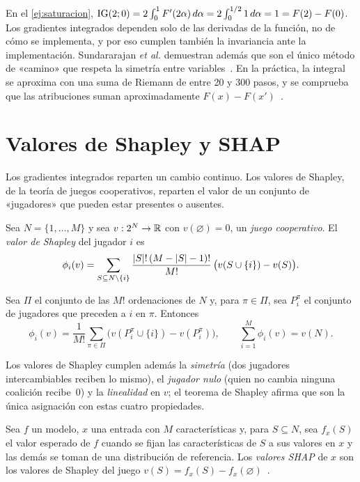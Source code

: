 En el \cref{ej:saturacion}, $\operatorname{IG}(2;0)=2\int_0^1F'(2\alpha)\,d\alpha=2\int_0^{1/2}1\,d\alpha=1=F(2)-F(0)$. Los gradientes integrados dependen solo de las derivadas de la función, no de cómo se implementa, y por eso cumplen también la invariancia ante la implementación. Sundararajan \emph{et al.} demuestran además que son el único método de «camino» que respeta la simetría entre variables~\cite[§4.2, teorema~1]{sundararajan}. En la práctica, la integral se aproxima con una suma de Riemann de entre 20 y 300 pasos, y se comprueba que las atribuciones suman aproximadamente $F(x)-F(x')$~\cite[§5]{sundararajan}.

\section{Valores de Shapley y SHAP}

Los gradientes integrados reparten un cambio continuo. Los valores de Shapley, de la teoría de juegos cooperativos, reparten el valor de un conjunto de «jugadores» que pueden estar presentes o ausentes.

\begin{definicion}\label{def:shapley}
Sea $N=\{1,\dots,M\}$ y sea $v:2^{N}\to\mathbb{R}$ con $v(\varnothing)=0$, un \emph{juego cooperativo}. El \emph{valor de Shapley} del jugador $i$ es
\[
\phi_i(v)=\sum_{S\subseteq N\setminus\{i\}}\frac{\lvert S\rvert!\,(M-\lvert S\rvert-1)!}{M!}\,\bigl(v(S\cup\{i\})-v(S)\bigr).
\]
\end{definicion}

\begin{proposicion}\label{prop:shapley}
Sea $\Pi$ el conjunto de las $M!$ ordenaciones de $N$ y, para $\pi\in\Pi$, sea $P_i^{\pi}$ el conjunto de jugadores que preceden a $i$ en $\pi$. Entonces
\[
\phi_i(v)=\frac{1}{M!}\sum_{\pi\in\Pi}\bigl(v(P_i^{\pi}\cup\{i\})-v(P_i^{\pi})\bigr),\qquad \sum_{i=1}^{M}\phi_i(v)=v(N).
\]
\end{proposicion}

Los valores de Shapley cumplen además la \emph{simetría} (dos jugadores intercambiables reciben lo mismo), el \emph{jugador nulo} (quien no cambia ninguna coalición recibe~0) y la \emph{linealidad} en $v$; el teorema de Shapley afirma que son la única asignación con estas cuatro propiedades.

\addtocounter{definicion}{1}%

\begin{definicion}[SHAP]\label{def:shap}
Sea $f$ un modelo, $x$ una entrada con $M$ características y, para $S\subseteq N$, sea $f_x(S)$ el valor esperado de $f$ cuando se fijan las características de $S$ a sus valores en $x$ y las demás se toman de una distribución de referencia. Los \emph{valores SHAP} de $x$ son los valores de Shapley del juego $v(S)=f_x(S)-f_x(\varnothing)$~\cite[§2 y teorema~1]{lundberg}.
\end{definicion}

